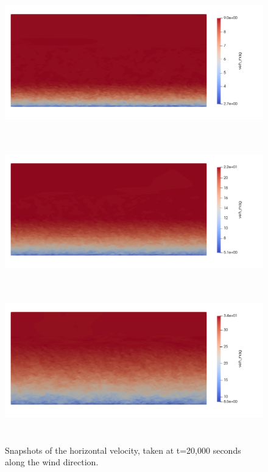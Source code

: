 \begin{figure}[hbt!]
  \centering
  \includegraphics[height=2.5in]{figures/snapshots/05ms/velh_mag_side.png} \\

  \includegraphics[height=2.5in]{figures/snapshots/10ms/velh_mag_side.png} \\

  \includegraphics[height=2.5in]{figures/snapshots/15ms/velh_mag_side.png} \\

  \caption{ \label{fig:SnapshotsSide} Snapshots of the horizontal
    velocity, taken at t=20,000 seconds along the wind direction. }
\end{figure}

